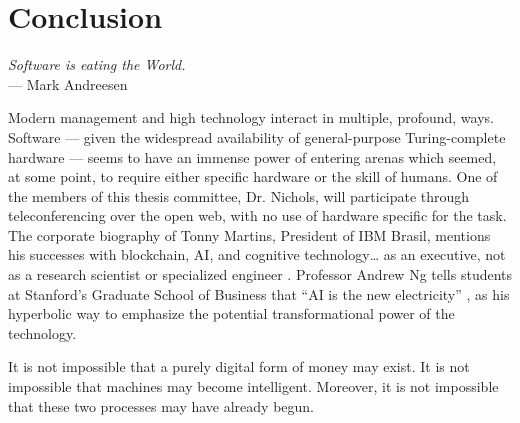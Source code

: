 \chapter{Conclusion}
\bigskip

\begin{flushright}{\slshape
	Software is eating the World.} \\ \medskip
    --- Mark Andreesen \citep{andreesen:2011}
\end{flushright}
\bigskip
\bigskip

\noindent Modern management and high technology interact in multiple, profound, ways.  Software --- given the widespread availability of general-purpose Turing-complete hardware --- seems to have an immense power of entering arenas which seemed, at some point, to require either specific hardware or the skill of humans.  One of the members of this thesis committee, Dr. Nichols, will participate through teleconferencing over the open web, with no use of hardware specific for the task.  The corporate biography of Tonny Martins, President of IBM Brasil, mentions his successes with blockchain, AI, and cognitive technology… as an executive, not as a research scientist or specialized engineer \citep{TonnyMartins}. Professor Andrew Ng tells students at Stanford’s Graduate School of Business that ``AI is the new electricity'' \citep{AndrewNgAI}, as his hyperbolic way to emphasize the potential transformational power of the technology.

It is not impossible that a purely digital form of money may exist.  It is not impossible that machines may become intelligent.  Moreover, it is not impossible that these two processes may have already begun.

